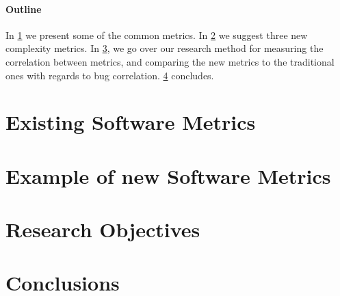 \documentclass[10pt,twocolumn]{article}
\author{Tome Levy\\
	Department of Computer Science\\
	Technion---Israel Institute of Technology\\
	\texttt{\small \href{mailto:liorsam@campus.Technion.ac.il}{liorsam@campus.Technion.ac.il}}}
\date{\small Advisor: Prof.\ Yossi Gil}
\begin{document}
\maketitle
  
\begin{abstract}
	 
\end{abstract}



\paragraph{Outline} 
In \cref{Section:metrics} we present some of the common metrics.
In \cref{Section:new-metrics} we suggest three new complexity metrics.
In \cref{Section:objectives}, we go over our research method for measuring
the correlation between metrics, and comparing the new metrics to the
traditional ones with regards to bug correlation.
\cref{Section:zz} concludes. 

\section{Existing Software Metrics}
\label{Section:metrics}
%

\section{Example of new Software Metrics}
\label{Section:new-metrics}
% 

\section{Research Objectives}
\label{Section:objectives}
%

\section{Conclusions}
\label{Section:zz}



%

\end{document}
